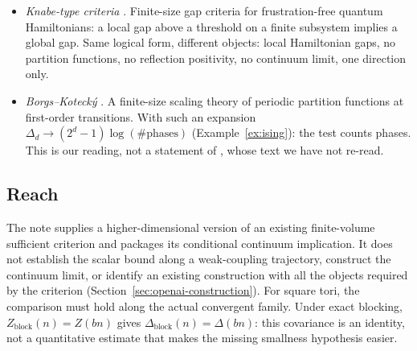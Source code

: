 \documentclass[11pt,a4paper]{article}
\theoremstyle{plain}
\theoremstyle{definition}
\theoremstyle{remark}
\numberwithin{equation}{section}
\begin{document}
\begin{itemize}
\item \emph{Knabe-type criteria} \cite{Kna88,GM16,Lem19}. Finite-size gap criteria for frustration-free quantum Hamiltonians: a local
gap above a threshold on a finite subsystem implies a global gap. Same logical form, different objects: local Hamiltonian gaps, no
partition functions, no reflection positivity, no continuum limit, one direction only.
\item \emph{Borgs--Koteck\'y} \cite{BK90}. A finite-size scaling theory of periodic partition functions at first-order transitions. With
such an expansion $\Delta_d\to(2^d-1)\log(\#\text{phases})$ (Example~\ref{ex:ising}): the test counts phases. This is our reading, not
a statement of \cite{BK90}, whose text we have not re-read.
\end{itemize}

\subsection{Reach}
The note supplies a higher-dimensional version of an existing finite-volume sufficient criterion and packages its conditional continuum
implication. It does not establish the scalar bound along a weak-coupling trajectory, construct the continuum limit, or identify an existing
construction with all the objects required by the criterion (Section~\ref{sec:openai-construction}). For square tori, the comparison must hold along
the actual convergent family. Under exact blocking, $Z_{\mathrm{block}}(n)=Z(bn)$ gives $\Delta_{\mathrm{block}}(n)=\Delta(bn)$: this covariance is
an identity, not a quantitative estimate that makes the missing smallness hypothesis easier.

\end{document}
